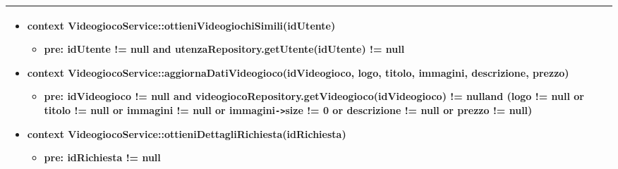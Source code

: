 \begin{tabular}{|| l | p{28em} ||}
\begin{itemize}[leftmargin=*]
		\item \textbf{context} VideogiocoService::ottieniVideogiochiSimili(idUtente)
		\begin{itemize}
			\item[ ] \textbf{pre:} idUtente != null and utenzaRepository.getUtente(idUtente) != null
		\end{itemize}

		\item \textbf{context} VideogiocoService::aggiornaDatiVideogioco(idVideogioco, logo, titolo, immagini, descrizione, prezzo)
		\begin{itemize}
			\item[ ] \textbf{pre:} idVideogioco != null  and videogiocoRepository.getVideogioco(idVideogioco) != nulland (logo != null or titolo != null or immagini != null or immagini\verb|->|size != 0 or descrizione != null or prezzo != null)
		\end{itemize}

		\item \textbf{context} VideogiocoService::ottieniDettagliRichiesta(idRichiesta)
		\begin{itemize}
			\item[ ] \textbf{pre:} idRichiesta != null
		\end{itemize}
	\end{itemize}\\
	\hline
\end{tabular}

\newpage
